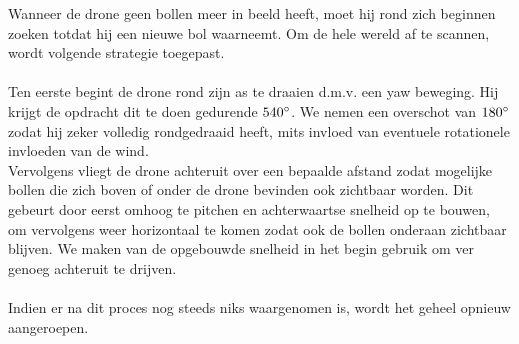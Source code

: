 \noindent
Wanneer de drone geen bollen meer in beeld heeft, moet hij rond zich beginnen zoeken totdat hij een nieuwe bol waarneemt. Om de hele wereld af te scannen, wordt volgende strategie toegepast.
\\
\\
Ten eerste begint de drone rond zijn as te draaien d.m.v. een yaw beweging. Hij krijgt de opdracht dit te doen gedurende \(540\degree\). We nemen een overschot van \(180\degree\) zodat hij zeker volledig rondgedraaid heeft, mits invloed van eventuele rotationele invloeden van de wind.
\\
Vervolgens vliegt de drone achteruit over een bepaalde afstand zodat mogelijke bollen die zich boven of onder de drone bevinden ook zichtbaar worden. Dit gebeurt door eerst omhoog te pitchen en achterwaartse snelheid op te bouwen, om vervolgens weer horizontaal te komen zodat ook de bollen onderaan zichtbaar blijven. We maken van de opgebouwde snelheid in het begin gebruik om ver genoeg achteruit te drijven.
\\
\\
Indien er na dit proces nog steeds niks waargenomen is, wordt het geheel opnieuw aangeroepen. 